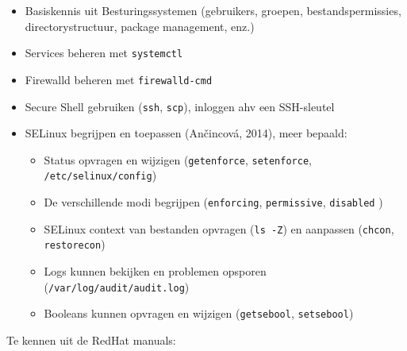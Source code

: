 \begin{itemize}
  \item Basiskennis uit Besturingssystemen (gebruikers, groepen, bestandspermissies, directorystructuur, package management, enz.)
  \item Services beheren met \texttt{systemctl}
  \item Firewalld beheren met \texttt{firewalld-cmd}
  \item Secure Shell gebruiken (\texttt{ssh}, \texttt{scp}), inloggen ahv een SSH-sleutel
  \item SELinux begrijpen en toepassen (Ančincová, 2014), meer bepaald:
  
  \begin{itemize}
    \item Status opvragen en wijzigen (\texttt{getenforce}, \texttt{setenforce}, \texttt{/etc/selinux/config})
    \item De verschillende modi begrijpen (\texttt{enforcing}, \texttt{permissive}, \texttt{disabled} )
    \item SELinux context van bestanden opvragen (\texttt{ls\ -Z}) en aanpassen (\texttt{chcon}, \texttt{restorecon})
    \item Logs kunnen bekijken en problemen opsporen (\texttt{/var/log/audit/audit.log})
    \item Booleans kunnen opvragen en wijzigen (\texttt{getsebool}, \texttt{setsebool})
  \end{itemize}
\end{itemize}

Te kennen uit de RedHat manuals:

